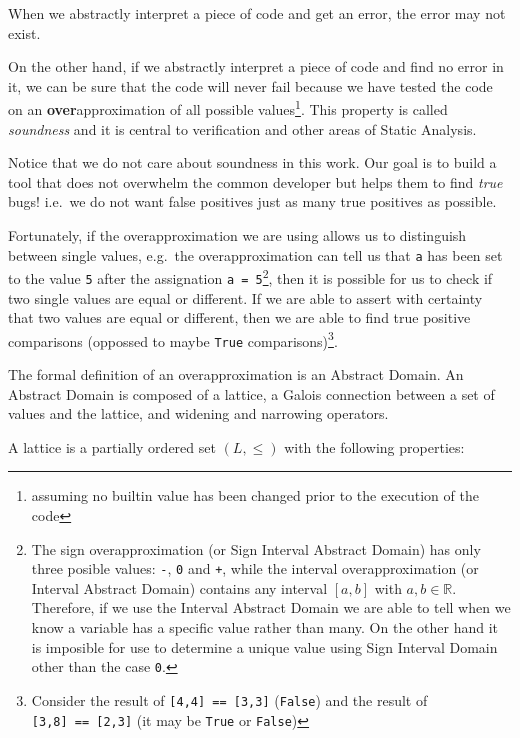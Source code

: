 When we abstractly interpret a piece of code and get an error, the error
may not exist.

On the other hand, if we abstractly interpret a piece of code and find
no error in it, we can be sure that the code will never fail because we
have tested the code on an \textbf{over}approximation of all possible
values\footnote{assuming no builtin value has been changed prior to the
  execution of the code}. This property is called \emph{soundness} and
it is central to verification and other areas of Static Analysis.

Notice that we do not care about soundness in this work. Our goal is to
build a tool that does not overwhelm the common developer but helps them
to find \emph{true} bugs! i.e.~we do not want false positives just as
many true positives as possible.

Fortunately, if the overapproximation we are using allows us to
distinguish between single values, e.g.~the overapproximation can tell
us that \texttt{a} has been set to the value \texttt{5} after the
assignation \texttt{a\ =\ 5}\footnote{The sign overapproximation (or
  Sign Interval Abstract Domain) has only three posible values:
  \texttt{-}, \texttt{0} and \texttt{+}, while the interval
  overapproximation (or Interval Abstract Domain) contains any interval
  \([a,b]\) with \(a,b \in \mathbb{R}\). Therefore, if we use the
  Interval Abstract Domain we are able to tell when we know a variable
  has a specific value rather than many. On the other hand it is
  imposible for use to determine a unique value using Sign Interval
  Domain other than the case \texttt{0}.}, then it is possible for us to
check if two single values are equal or different. If we are able to
assert with certainty that two values are equal or different, then we
are able to find true positive comparisons (oppossed to maybe
\texttt{True} comparisons)\footnote{Consider the result of
  \texttt{{[}4,4{]}\ ==\ {[}3,3{]}} (\texttt{False}) and the result of
  \texttt{{[}3,8{]}\ ==\ {[}2,3{]}} (it may be \texttt{True} or
  \texttt{False})}.

The formal definition of an overapproximation is an Abstract Domain. An
Abstract Domain is composed of a lattice, a Galois connection between a
set of values and the lattice, and widening and narrowing operators.

A lattice is a partially ordered set \((L, \le)\) with the following
properties:

